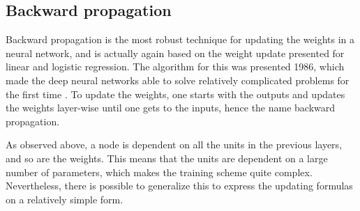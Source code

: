 \subsection{Backward propagation} \label{sec:backward}
Backward propagation is the most robust technique for updating the weights in a neural network, and is actually again based on the weight update presented for linear and logistic regression. The algorithm for this was presented 1986, which made the deep neural networks able to solve relatively complicated problems for the first time \cite{rumelhart_learning_1986}. To update the weights, one starts with the outputs and updates the weights layer-wise until one gets to the inputs, hence the name backward propagation. 

As observed above, a node is dependent on all the units in the previous layers, and so are the weights. This means that the units are dependent on a large number of parameters, which makes the training scheme quite complex. Nevertheless, there is possible to generalize this to express the updating formulas on a relatively simple form.

